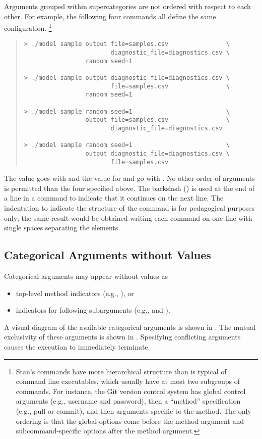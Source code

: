Arguments grouped within supercategories are not ordered with respect
to each other.  For example, the following four commands all define
the same configuration.%
%
\footnote{
  Stan's commands have more hierarchical structure than is typical of
  command line executables, which usually have at most two subgroups
  of commands.  For instance, the Git version control system has
  global control arguments (e.g., username and password), then a
  ``method'' specification (e.g., pull or commit), and then arguments
  specific to the method.  The only ordering is that the global
  options come before the method argument and subcommand-specific
  options after the method argument.}
%
\begin{quote}
\begin{Verbatim}[fontshape=sl]
> ./model sample output file=samples.csv                \
                        diagnostic_file=diagnostics.csv \
                 random seed=1

> ./model sample output diagnostic_file=diagnostics.csv \
                        file=samples.csv                \
                 random seed=1

> ./model sample random seed=1                          \
                 output file=samples.csv                \
                        diagnostic_file=diagnostics.csv 

> ./model sample random seed=1                          \
                 output diagnostic_file=diagnostics.csv \
                        file=samples.csv 
\end{Verbatim}
\end{quote}
%
The value \code{seed} goes with \code{random} and the value for
 and  go with .  No
other order of arguments is permitted than the four specified above.
The backslash (\code{\textbackslash}) is used at the end of a line in
a command to indicate that it continues on the next line.  The
indentation to indicate the structure of the command is for
pedagogical purposes only; the same result would be obtained writing
each command on one line with single spaces separating the elements.

\subsection{Categorical Arguments without Values}

Categorical arguments may appear without values as
%
\begin{itemize}
\item top-level method indicators (e.g., \code{sample}), or
\item indicators for following subarguments (e.g., \code{random}
  and ).
\end{itemize}
%
A visual diagram of the available categorical arguments is shown in
.  The mutual exclusivity of these arguments is
shown in .  Specifying conflicting arguments
causes the execution to immediately terminate.

